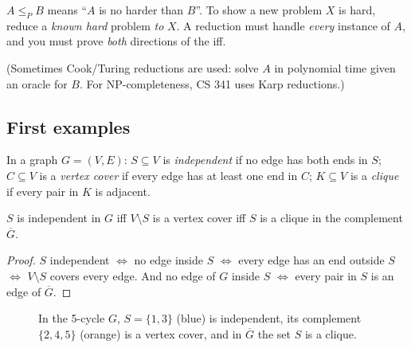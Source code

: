 \begin{important}[Direction]
$A\le_PB$ means ``$A$ is no harder than $B$''. To show a new problem $X$ is hard, reduce a \emph{known hard} problem \emph{to} $X$.
A reduction must handle \emph{every} instance of $A$, and you must prove \emph{both} directions of the iff.
\end{important}

(Sometimes Cook/Turing reductions are used: solve $A$ in polynomial time given an oracle for $B$. For NP-completeness, CS 341 uses Karp reductions.)

\subsection{First examples}
\begin{definition}
In a graph $G=(V,E)$: $S\subseteq V$ is \emph{independent} if no edge has both ends in $S$; $C\subseteq V$ is a \emph{vertex cover} if every edge has at least
one end in $C$; $K\subseteq V$ is a \emph{clique} if every pair in $K$ is adjacent.
\end{definition}

\begin{lemma}
$S$ is independent in $G$ iff $V\setminus S$ is a vertex cover iff $S$ is a clique in the complement $\overline G$.
\end{lemma}
\begin{proof}
$S$ independent $\iff$ no edge inside $S$ $\iff$ every edge has an end outside $S$ $\iff$ $V\setminus S$ covers every edge.
And no edge of $G$ inside $S$ $\iff$ every pair in $S$ is an edge of $\overline G$.
\end{proof}

\begin{figure}[H]
\centering
{}
\caption{In the 5-cycle $G$, $S=\{1,3\}$ (blue) is independent, its
complement $\{2,4,5\}$ (orange) is a vertex cover, and in $\overline G$
the set $S$ is a clique.}
\end{figure}

